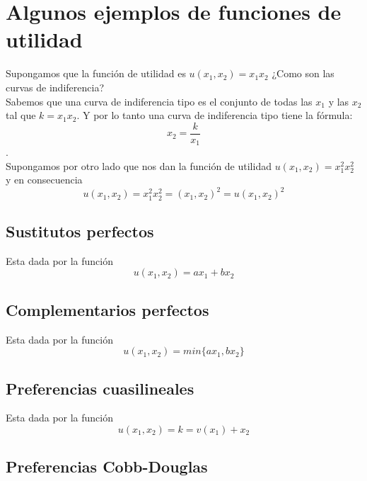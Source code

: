 \documentclass[10pt]{article}
\begin{document}
\section*{Algunos ejemplos de funciones de utilidad}
Supongamos que la función de utilidad es $u(x_1,x_2)=x_1 x_2$ ¿Como son las curvas de indiferencia?\\
Sabemos que una curva de indiferencia tipo es el conjunto de todas las $x_1$ y las $x_2$ tal que $k=x_1 x_2$. Y por lo tanto una curva de indiferencia tipo tiene la fórmula: $$x_2=\dfrac{k}{x_1}$$.\\
Supongamos por otro lado que nos dan la función de utilidad $u(x_1,x_2)=x_1^2 x_2^2$ y en consecuencia $$u(x_1,x_2)=x_1^2 x_2^2 = (x_1,x_2)^2 =u(x_1,x_2)^2$$

\subsection*{Sustitutos perfectos}
Esta dada por la función $$u(x_1,x_2)=ax_1 + bx_2$$

\subsection*{Complementarios perfectos}
Esta dada por la función $$u(x_1,x_2)=min\lbrace ax_1, bx_2\rbrace$$

\subsection*{Preferencias cuasilineales}
Esta dada por la función $$u(x_1,x_2)=k=v(x_1)+x_2$$

\subsection*{Preferencias Cobb-Douglas}
\end{document}
